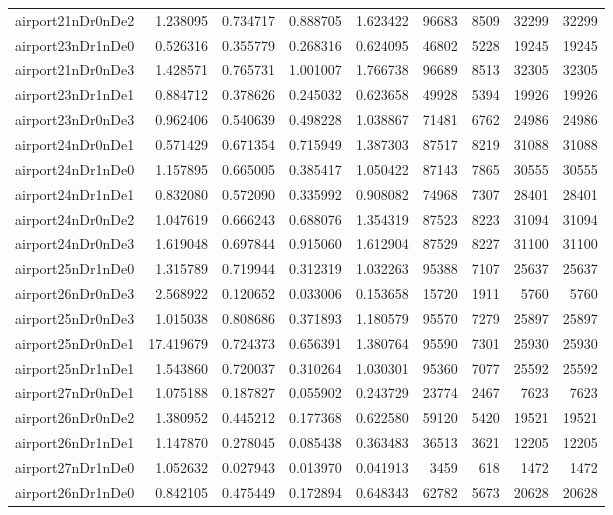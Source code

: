 \documentclass[../../../thesis.tex]{subfiles}
\begin{document}
\begin{longtable}{|l|r|r|r|r|r|r|r|r|}
airport21nDr0nDe2 & 1.238095 & 0.734717 & 0.888705 & 1.623422 & 96683 & 8509 & 32299 & 32299 \\
airport23nDr1nDe0 & 0.526316 & 0.355779 & 0.268316 & 0.624095 & 46802 & 5228 & 19245 & 19245 \\
airport21nDr0nDe3 & 1.428571 & 0.765731 & 1.001007 & 1.766738 & 96689 & 8513 & 32305 & 32305 \\
airport23nDr1nDe1 & 0.884712 & 0.378626 & 0.245032 & 0.623658 & 49928 & 5394 & 19926 & 19926 \\
airport23nDr0nDe3 & 0.962406 & 0.540639 & 0.498228 & 1.038867 & 71481 & 6762 & 24986 & 24986 \\
airport24nDr0nDe1 & 0.571429 & 0.671354 & 0.715949 & 1.387303 & 87517 & 8219 & 31088 & 31088 \\
airport24nDr1nDe0 & 1.157895 & 0.665005 & 0.385417 & 1.050422 & 87143 & 7865 & 30555 & 30555 \\
airport24nDr1nDe1 & 0.832080 & 0.572090 & 0.335992 & 0.908082 & 74968 & 7307 & 28401 & 28401 \\
airport24nDr0nDe2 & 1.047619 & 0.666243 & 0.688076 & 1.354319 & 87523 & 8223 & 31094 & 31094 \\
airport24nDr0nDe3 & 1.619048 & 0.697844 & 0.915060 & 1.612904 & 87529 & 8227 & 31100 & 31100 \\
airport25nDr1nDe0 & 1.315789 & 0.719944 & 0.312319 & 1.032263 & 95388 & 7107 & 25637 & 25637 \\
airport26nDr0nDe3 & 2.568922 & 0.120652 & 0.033006 & 0.153658 & 15720 & 1911 & 5760 & 5760 \\
airport25nDr0nDe3 & 1.015038 & 0.808686 & 0.371893 & 1.180579 & 95570 & 7279 & 25897 & 25897 \\
airport25nDr0nDe1 & 17.419679 & 0.724373 & 0.656391 & 1.380764 & 95590 & 7301 & 25930 & 25930 \\
airport25nDr1nDe1 & 1.543860 & 0.720037 & 0.310264 & 1.030301 & 95360 & 7077 & 25592 & 25592 \\
airport27nDr0nDe1 & 1.075188 & 0.187827 & 0.055902 & 0.243729 & 23774 & 2467 & 7623 & 7623 \\
airport26nDr0nDe2 & 1.380952 & 0.445212 & 0.177368 & 0.622580 & 59120 & 5420 & 19521 & 19521 \\
airport26nDr1nDe1 & 1.147870 & 0.278045 & 0.085438 & 0.363483 & 36513 & 3621 & 12205 & 12205 \\
airport27nDr1nDe0 & 1.052632 & 0.027943 & 0.013970 & 0.041913 & 3459 & 618 & 1472 & 1472 \\
airport26nDr1nDe0 & 0.842105 & 0.475449 & 0.172894 & 0.648343 & 62782 & 5673 & 20628 & 20628 \\

\end{longtable}
\end{document}
